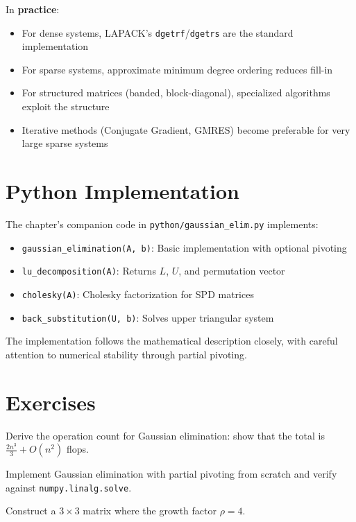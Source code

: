 In \textbf{practice}:
\begin{itemize}
    \item For dense systems, LAPACK's \texttt{dgetrf}/\texttt{dgetrs} are the standard implementation
    \item For sparse systems, approximate minimum degree ordering reduces fill-in
    \item For structured matrices (banded, block-diagonal), specialized algorithms exploit the structure
    \item Iterative methods (Conjugate Gradient, GMRES) become preferable for very large sparse systems
\end{itemize}

\section{Python Implementation}

The chapter's companion code in \texttt{python/gaussian\_elim.py} implements:
\begin{itemize}
    \item \texttt{gaussian\_elimination(A, b)}: Basic implementation with optional pivoting
    \item \texttt{lu\_decomposition(A)}: Returns $L$, $U$, and permutation vector
    \item \texttt{cholesky(A)}: Cholesky factorization for SPD matrices
    \item \texttt{back\_substitution(U, b)}: Solves upper triangular system
\end{itemize}

The implementation follows the mathematical description closely, with careful attention to numerical stability through partial pivoting.

\section{Exercises}

\begin{exercise}
Derive the operation count for Gaussian elimination: show that the total is $\frac{2n^3}{3} + O(n^2)$ flops.
\end{exercise}

\begin{exercise}
Implement Gaussian elimination with partial pivoting from scratch and verify against \texttt{numpy.linalg.solve}.
\end{exercise}

\begin{exercise}
Construct a $3 \times 3$ matrix where the growth factor $\rho = 4$.
\end{exercise}

